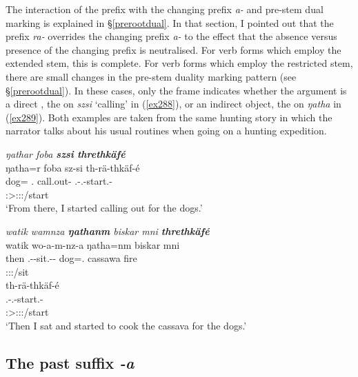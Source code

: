 The interaction of the  prefix with the  changing prefix \emph{a-} and pre-stem dual marking is explained in \S{}\ref{prerootdual}. In that section, I pointed out that the  prefix \emph{ra-} overrides the  changing prefix \emph{a-} to the effect that the absence versus presence of the  changing prefix is neutralised. For verb forms which employ the extended stem, this  is complete. For verb forms which employ the restricted stem, there are small changes in the pre-stem duality marking pattern (see \S{}\ref{prerootdual}).  In these cases, only the  frame indicates whether the  argument is a direct , the \Abs{}  on \emph{szsi} `calling' in (\ref{ex288}), or an indirect object, the \Dat{}  on \emph{ŋatha} in (\ref{ex289}). Both examples are taken from the same hunting story in which the narrator talks about his usual routines when going on a hunting expedition.

\begin{exe}
	\ex \emph{ŋathar foba \textbf{szsi} \textbf{threthkäfé}}\\
	\glll ŋatha=r foba sz-si th-rä-thkäf-é\\
	dog=\Purp{} \Dist.\Abl{} call.out-\Nmlz{} \Stnsg.\Bet-\Irr.\Ndu-start.\Rs-\Fsg\\
	{} {} {} \footnotesize{\Fsg:\Sbj>\Stpl:\Obj:\Irr:\Pfv/start}\\
	\trans `From there, I started calling out for the dogs.' 
	\label{ex288}
\end{exe}
\begin{exe}
	\ex \emph{watik wamnza \textbf{ŋathanm} biskar mni \textbf{threthkäfé}}\\
	\glll watik wo-a-m-nz-a ŋatha=nm biskar mni\\
	then \Fsg.\Alph-\Vc-sit.\Ext-\Ndu-\Pst{} dog=\Dat.\Nsg{} cassawa fire\\
	{} \footnotesize{\Fsg:\Sbj:\Pst:\Ipfv/sit} {} {} {}\\
	\sn
	\glll th-rä-thkäf-é\\
	\Stnsg.\Bet-\Irr.\Ndu-start.\Rs-\Fsg\\
	\footnotesize{\Fsg:\Sbj>\Stpl:\Obj:\Irr:\Pfv/start}\\
	\trans `Then I sat and started to cook the cassava for the dogs.' 
	\label{ex289}
\end{exe}

\subsection{The past suffix \emph{-a}} \label{pastsuffixa}

